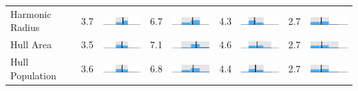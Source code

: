 \begin{table}
\begin{tabular}{l rm{7em} rm{7em} rm{7em} rm{7em}}
Harmonic Radius        &   3.7 &  \includegraphics[width=7em]{mini_hist/WI_2004_harm_radius} &   6.7 &  \includegraphics[width=7em]{mini_hist/WI_2008_harm_radius} &   4.3 &  \includegraphics[width=7em]{mini_hist/WI_2012_harm_radius} &   2.7 &  \includegraphics[width=7em]{mini_hist/WI_2016_harm_radius} \\
Hull Area              &   3.5 &       \includegraphics[width=7em]{mini_hist/WI_2004_hull_a} &   7.1 &       \includegraphics[width=7em]{mini_hist/WI_2008_hull_a} &   4.6 &       \includegraphics[width=7em]{mini_hist/WI_2012_hull_a} &   2.7 &       \includegraphics[width=7em]{mini_hist/WI_2016_hull_a} \\
Hull Population        &   3.6 &       \includegraphics[width=7em]{mini_hist/WI_2004_hull_p} &   6.8 &       \includegraphics[width=7em]{mini_hist/WI_2008_hull_p} &   4.4 &       \includegraphics[width=7em]{mini_hist/WI_2012_hull_p} &   2.7 &       \includegraphics[width=7em]{mini_hist/WI_2016_hull_p} \\

\end{tabular}
\end{table}
